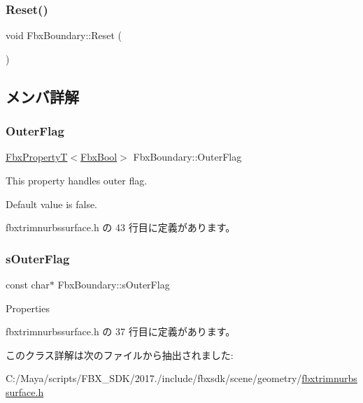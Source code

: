 \mbox{\label{class_fbx_boundary_a989aba9b8873dc0c8264879b75f86dee}} 
\subsubsection{\texorpdfstring{Reset()}{Reset()}}
{\footnotesize\ttfamily void Fbx\+Boundary\+::\+Reset (\begin{DoxyParamCaption}{ }\end{DoxyParamCaption})\hspace{0.3cm}{\ttfamily [protected]}}



\subsection{メンバ詳解}
\mbox{\label{class_fbx_boundary_af9e27e491f466ca615bd247fa2b33826}} 
\subsubsection{\texorpdfstring{Outer\+Flag}{OuterFlag}}
{\footnotesize\ttfamily \hyperlink{class_fbx_property_t}{Fbx\+PropertyT}$<$\hyperlink{fbxtypes_8h_a92e0562b2fe33e76a242f498b362262e}{Fbx\+Bool}$>$ Fbx\+Boundary\+::\+Outer\+Flag}

This property handles outer flag.

Default value is false. 

 fbxtrimnurbssurface.\+h の 43 行目に定義があります。

\mbox{\label{class_fbx_boundary_a2a42aaddc584761f409ced017e6ddd35}} 
\subsubsection{\texorpdfstring{s\+Outer\+Flag}{sOuterFlag}}
{\footnotesize\ttfamily const char$\ast$ Fbx\+Boundary\+::s\+Outer\+Flag\hspace{0.3cm}{\ttfamily [static]}}



Properties 



 fbxtrimnurbssurface.\+h の 37 行目に定義があります。



このクラス詳解は次のファイルから抽出されました\+:\begin{DoxyCompactItemize}
\item 
C\+:/\+Maya/scripts/\+F\+B\+X\+\_\+\+S\+D\+K/2017./include/fbxsdk/scene/geometry/\hyperlink{fbxtrimnurbssurface_8h}{fbxtrimnurbssurface.\+h}\end{DoxyCompactItemize}
